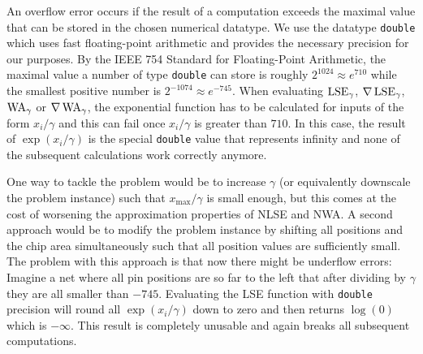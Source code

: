 An overflow error occurs if the result of a computation exceeds the maximal value that can be stored in the chosen numerical datatype.
We use the datatype \texttt{double} which uses fast floating-point arithmetic and provides the necessary precision for our purposes.
By the IEEE 754 Standard for Floating-Point Arithmetic, the maximal value a number of type \texttt{double} can store is roughly \(2^{1024} \approx e^{710}\)
while the smallest positive number is \(2^{-1074} \approx e^{-745}\).
When evaluating \(\operatorname{LSE}_\gamma\), \(\nabla \operatorname{LSE}_\gamma\), \(\operatorname{WA}_\gamma\) or \(\nabla \operatorname{WA}_\gamma\),
the exponential function has to be calculated for inputs of the form \(x_i/\gamma\)
and this can fail once \(x_i /\gamma\) is greater than \(710\).
In this case, the result of \(\exp(x_i/\gamma)\) is the special \texttt{double} value that represents infinity and none of the subsequent calculations work correctly anymore.

One way to tackle the problem would be to increase \(\gamma\) (or equivalently downscale the problem instance)
such that \(x_{\max}/\gamma\) is small enough, but this comes at the cost of worsening the approximation properties of NLSE and NWA.
A second approach would be to modify the problem instance by shifting all positions and the chip area simultaneously such that all position values are sufficiently small.
The problem with this approach is that now there might be underflow errors:
Imagine a net where all pin positions are so far to the left that after dividing by \(\gamma\) they are all smaller than \(-745\).
Evaluating the LSE function with \texttt{double} precision will round all \(\exp(x_i / \gamma)\) down to zero and then returns \(\log(0)\) which is \(-\infty\).
This result is completely unusable and again breaks all subsequent computations.

